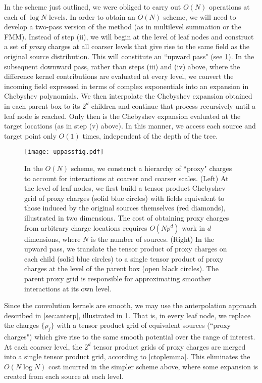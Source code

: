 \documentclass[final,letterpaper]{siamart171218}
\begin{document}
In the scheme just outlined, we were obliged to carry out $O(N)$ operations at each of 
$\log N$ levels. In order to obtain an $O(N)$ scheme, we will need to develop a two-pass
version of the method (as in multilevel summation or the FMM). 
Instead of step (ii), we 
will begin at the level of leaf nodes and construct a set of {\em proxy} charges 
at all 
coarser levels that give rise to the same field as the original source distribution.
This will constitute an ``upward pass" (see \cref{uppassfig}). 
In the subsequent downward pass, rather than steps (iii) and (iv) above, where the difference
kernel contributions are evaluated at every level, we convert the 
incoming field expressed in terms of complex exponentials into 
an expansion in Chebyshev polynomials.
We then interpolate the Chebyshev expansion obtained in each parent box to its $2^d$
children and continue that process recursively until a leaf node is reached. Only then
is the Chebyshev expansion evaluated at the target locations (as in step (v) above).
In this manner, we access each source and target point only $O(1)$ times, 
independent of the depth of the tree.

\begin{figure}[!ht]
\centering
   \texttt{[image: uppassfig.pdf]}
   \caption{\sf 
In the $O(N)$ scheme, we construct a hierarchy of ``proxy"
charges to account for interactions at coarser and coarser scales.
(Left) At the level of leaf nodes, we first build a tensor product Chebyshev grid 
of proxy charges (solid blue circles) with fields equivalent to those induced by the 
original sources themselves (red diamonds), illustrated in two dimensions.
The cost of obtaining proxy charges from arbitrary charge locations 
requires $O(N p^d)$ work in $d$ dimensions, where $N$ is the number of sources.
(Right) In the upward pass, we translate the tensor product of proxy charges on each
child (solid blue circles) to a single tensor product of proxy charges at the level of 
the parent box (open black circles).
The parent proxy grid is responsible for approximating smoother interactions at its
own level. 
}
\label{uppassfig}
\end{figure}


Since the convolution kernels are smooth, we may use the anterpolation  approach 
described in \cref{sec:anterp},
illustrated in \cref{uppassfig}.
That is, in every leaf node, we replace the charges $\{ \rho_j\}$ with a 
tensor product grid of equivalent sources (``proxy charges") which give rise to the same smooth
potential over the range of interest.
At each coarser level, the $2^d$ tensor product grids of proxy charges 
are merged into a single tensor product grid, according to \cref{ctoplemma}.
This eliminates the $O(N \log N)$ cost incurred in the simpler scheme above, 
where some expansion is created from each source at each level.
\end{document}
